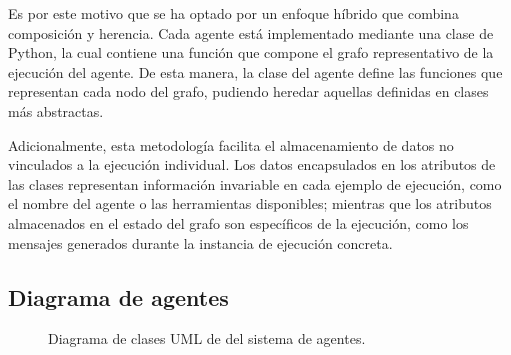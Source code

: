 Es por este motivo que se ha optado por un enfoque híbrido que combina composición y herencia. Cada agente está implementado mediante una clase de Python, la cual contiene una función que compone el grafo representativo de la ejecución del agente. De esta manera, la clase del agente define las funciones que representan cada nodo del grafo, pudiendo heredar aquellas definidas en clases más abstractas.

Adicionalmente, esta metodología facilita el almacenamiento de datos no vinculados a la ejecución individual. Los datos encapsulados en los atributos de las clases representan información invariable en cada ejemplo de ejecución, como el nombre del agente o las herramientas disponibles; mientras que los atributos almacenados en el estado del grafo son específicos de la ejecución, como los mensajes generados durante la instancia de ejecución concreta.

\subsection{Diagrama de agentes}

\begin{figure}[h]
  \centering
  \caption{Diagrama de clases UML de del sistema de agentes.}
  \label{fig:uml}
\end{figure}

